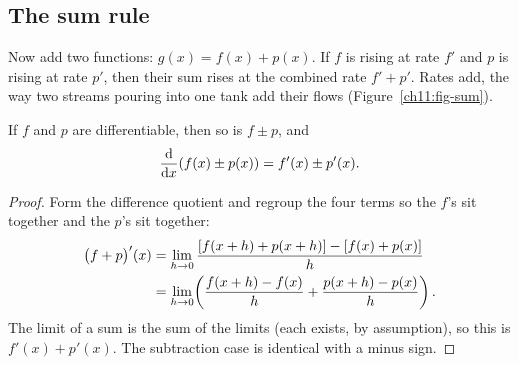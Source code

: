 \subsection{The sum rule}

Now add two functions: $g(x)=f(x)+p(x)$. If $f$ is rising at rate $f'$ and $p$ is rising
at rate $p'$, then their sum rises at the combined rate $f'+p'$. Rates add, the
way two streams pouring into one tank add their flows (Figure~\ref{ch11:fig-sum}).

\begin{theorem}\label{ch11:thm-sum}
If $f$ and $p$ are differentiable, then so is $f\pm p$, and
\[
  \frac{\mathrm{d}}{\mathrm{d} x}\!\left(f(x)\pm p(x)\right) = f'(x)\pm p'(x).
\]
\end{theorem}

\begin{proof}
Form the difference quotient and regroup the four terms so the $f$'s sit together and the
$p$'s sit together:
\begin{align*}
  \big(f+p\big)'(x)
  &= \lim_{h\to 0}\frac{[f(x+h)+p(x+h)] - [f(x)+p(x)]}{h} \\
  &= \lim_{h\to 0}\!\left(\frac{f(x+h)-f(x)}{h} + \frac{p(x+h)-p(x)}{h}\right).
\end{align*}
The limit of a sum is the sum of the limits (each exists, by assumption), so this is
$f'(x)+p'(x)$. The subtraction case is identical with a minus sign.
\end{proof}

